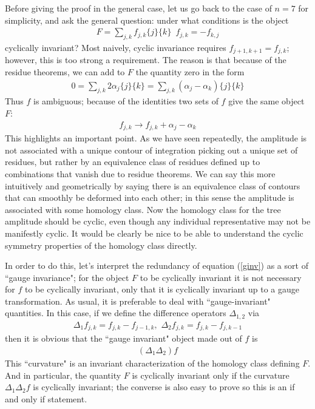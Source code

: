 \documentclass[12pt]{article}
\newcommand{\be}{\begin{eqnarray}}
\newcommand{\ee}{\end{eqnarray}}
\begin{document}
Before giving the proof in the general case, let us go back to the case of $n=7$ for
simplicity, and ask the general question: under what conditions is the object
\be
F = \sum_{j,k} f_{j,k} \{j\} \{k\} \, \, \, f_{j,k} = -f_{k,j}
\ee
cyclically invariant? Most naively, cyclic invariance requires $f_{j+1,k+1} = f_{j,k}$; however, this is too strong a requirement. The reason is that because of the residue theorems, we can add to $F$ the quantity zero in the form
\be
0 = \sum_{j,k} 2 \alpha_j \{j\} \{k\} = \sum_{j,k} (\alpha_j - \alpha_k) \{j\} \{k\}
\ee
Thus $f$ is ambiguous; because of the identities two sets of $f$ give the same object $F$:
\be
\label{ginv}
f_{j,k} \to f_{j,k} + \alpha_j - \alpha_k
\ee
This highlights an important point. As we have seen repeatedly, the amplitude is not associated with a unique contour of integration picking out a unique set of residues, but rather by an equivalence class of residues defined up to combinations that vanish due to residue theorems. We can say this more intuitively and geometrically by saying there is an equivalence class of contours that can smoothly be deformed into each other; in this sense the amplitude is associated with some homology class. Now the homology class for the tree amplitude should be cyclic, even though any individual representative may not be manifestly cyclic. It would be clearly be nice to be able to understand the cyclic symmetry properties of the homology class directly.

In order to do this, let's interpret the redundancy of equation (\ref{ginv}) as a sort of ``gauge invariance"; for the object $F$ to be cyclically invariant it is not necessary for $f$ to be cyclically invariant, only that it is cyclically invariant up to a gauge transformation. As usual, it is preferable to deal with ``gauge-invariant" quantities. In this case, if we define the difference operators $\Delta_{1,2}$ via
\be
\Delta_1 f_{j,k} = f_{j,k} - f_{j-1,k}, \, \, \Delta_2 f_{j,k} = f_{j,k} - f_{j,k-1}
\ee
then it is obvious that the ``gauge invariant" object made out of $f$ is
\be
(\Delta_1 \Delta_2) f
\ee
This ``curvature" is an invariant characterization of the homology class defining $F$. And in particular,
the quantity $F$ is cyclically invariant only if the curvature $\Delta_1 \Delta_2 f$ is cyclically invariant; the converse is
also easy to prove so this is an if and only if statement.
\end{document}
